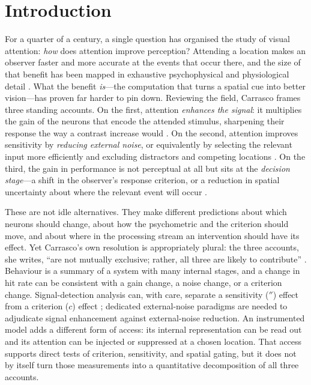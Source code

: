 
\section{Introduction}
\label{sec:intro}

For a quarter of a century, a single question has organised the study of
visual attention: \emph{how} does attention improve perception? Attending a
location makes an observer faster and more accurate at the events that occur
there, and the size of that benefit has been mapped in exhaustive
psychophysical and physiological detail \cite{carrasco2011_visual_attention_25y,
posner1980_orienting}. What the benefit \emph{is}---the computation that turns a
spatial cue into better vision---has proven far harder to pin down. Reviewing
the field, Carrasco \cite{carrasco2011_visual_attention_25y} frames three
standing accounts. On the first, attention \emph{enhances the signal}: it
multiplies the gain of the neurons that encode the attended stimulus, sharpening
their response the way a contrast increase would
\cite{reynolds_heeger2009_normalization, mcadams_maunsell1999_v4_tuning,
treue_martinez_trujillo1999_feature_attention, sani2017_temporal_v4_gain}. On
the second, attention improves sensitivity by \emph{reducing external noise}, or
equivalently by selecting the relevant input more efficiently and excluding
distractors and competing locations \cite{CohenMaunsell2009}. On the third, the
gain in performance is not perceptual at all but sits at the \emph{decision
stage}---a shift in the observer's response criterion, or a reduction in spatial
uncertainty about where the relevant event will occur \cite{MullerFindlay1987,
posner1980_orienting}.

These are not idle alternatives. They make different predictions about which
neurons should change, about how the psychometric and the criterion should move,
and about where in the processing stream an intervention should have its effect.
Yet Carrasco's own resolution is appropriately plural: the three accounts,
she writes, ``are not mutually exclusive; rather, all three are likely to
contribute'' \cite{carrasco2011_visual_attention_25y}. Behaviour is a summary of a
system with many internal stages, and a change in hit rate can be consistent with
a gain change, a noise change, or a criterion change. Signal-detection analysis can,
with care, separate a sensitivity ($\dprime$) effect from a criterion ($c$) effect
\cite{MullerFindlay1987}; dedicated external-noise paradigms are needed to adjudicate
signal enhancement against external-noise reduction. An instrumented model adds a
different form of access: its internal representation can be read out and its
attention can be injected or suppressed at a chosen location. That access supports
direct tests of criterion, sensitivity, and spatial gating, but it does not by itself
turn those measurements into a quantitative decomposition of all three accounts.

